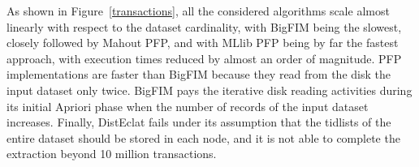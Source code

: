 As shown in Figure~\ref{transactions}, all the considered algorithms scale
almost linearly with respect to the dataset cardinality, with BigFIM being the slowest,
closely followed by Mahout PFP,
and with MLlib PFP being by far the fastest approach,
with execution times reduced by almost an order of magnitude. 
PFP implementations are faster than BigFIM because they read from the disk the input dataset only twice. 
BigFIM pays the iterative disk reading activities during its initial Apriori phase when the number of records
of the input dataset increases.
Finally, DistEclat fails under its assumption that the tidlists of the entire dataset should
be stored in each node, and it is not able to complete the extraction beyond
10 million transactions.
%








